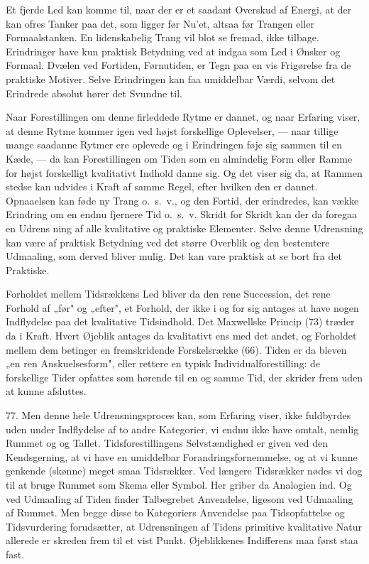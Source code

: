 \documentclass[12pt,a4paper]{book}
\newcommand{\opage}[1]{\marginnote{\footnotesize\textit{[#1]}}}
\begin{document}
Et fjerde Led kan komme til, naar der er et saadant Overskud af Energi,
at der kan ofres Tanker paa det, som ligger før Nu'et, altsaa før
Trangen eller Formaalstanken. En lidenskabelig Trang vil blot se fremad,
ikke tilbage. Erindringer have kun praktisk Betydning ved at indgaa som
Led i Ønsker og Formaal. Dvælen ved Fortiden, Førnutiden, er Tegn paa en
vis Frigørelse fra de praktiske Motiver. Selve Erindringen kan faa
umiddelbar Værdi, selvom det Erindrede absolut hører det Svundne til.

Naar Forestillingen om denne firleddede Rytme er dannet, og naar
Erfaring viser, at denne Rytme kommer igen ved højst forskellige
Oplevelser, --- naar tillige mange saadanne Rytmer ere oplevede og i
Erindringen føje sig sammen til en Kæde, --- da kan Forestillingen om
Tiden som en almindelig Form eller Ramme for højst forskelligt
kvalitativt Indhold danne sig. Og det viser sig da, at Rammen stedse kan
udvides i Kraft af samme Regel, efter hvilken den er dannet. Opnaaelsen
kan føde ny Trang o.\ s.\ v., og den Fortid, der erindredes, kan vække
Erindring om en endnu fjernere Tid o.\ s.\ v. Skridt for Skridt kan der
da foregaa en Udrens%
\opage{188}ning af alle kvalitative og praktiske Elementer.
Selve denne Udrensning kan være af praktisk Betydning ved det større
Overblik og den bestemtere Udmaaling, som derved bliver mulig. Det kan
vare praktisk at se bort fra det Praktiske.

Forholdet mellem Tidsrækkens Led bliver da den rene Succession, det rene
Forhold af „før" og „efter", et Forhold, der ikke i og for sig antages
at have nogen Indflydelse paa det kvalitative Tidsindhold. Det
Maxwellske Princip (73) træder da i Kraft. Hvert Øjeblik antages da
kvalitativt ens med det andet, og Forholdet mellem dem betinger en
fremskridende Forskelsrække (66). Tiden er da bleven „en ren
Anskuelsesform", eller rettere en typisk Individualforestilling: de
forskellige Tider opfattes som hørende til en og samme Tid, der skrider
frem uden at kunne afsluttes.

77. Men denne hele Udrensningsproces kan, som Erfaring viser, ikke
fuldbyrdes uden under Indflydelse af to andre Kategorier, vi endnu ikke
have omtalt, nemlig Rummet og og Tallet. Tidsforestillingens
Selvstændighed er given ved den Kendsgerning, at vi have en umiddelbar
Forandringsfornemmelse, og at vi kunne genkende (skønne) meget smaa
Tidsrækker. Ved længere Tidsrækker nødes vi dog til at bruge Rummet som
Skema eller Symbol. Her griber da Analogien ind. Og ved Udmaaling af
Tiden finder Talbegrebet Anvendelse, ligesom ved Udmaaling af Rummet.
Men begge disse to Kategoriers Anvendelse paa Tidsopfattelse og
Tidsvurdering forudsætter, at Udrensningen af Tidens primitive
kvalitative Natur allerede er skreden frem til et vist Punkt.
Øjeblikkenes Indifferens maa først staa fast.
\end{document}
